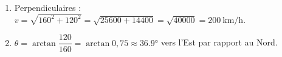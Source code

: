 \documentclass[11pt,a4paper]{article}
\begin{document}
\begin{corrige}
\begin{enumerate}[label=\alph*)]
  \item Perpendiculaires : $v=\sqrt{160^2+120^2}=\sqrt{25600+14400}=\sqrt{40000}=\qty{200}{\kilo\metre\per\hour}$.
  \item $\theta=\arctan\dfrac{120}{160}=\arctan0{,}75\approx\ang{36,9}$ vers l'Est par rapport au Nord.
\end{enumerate}
\end{corrige}
\end{document}
